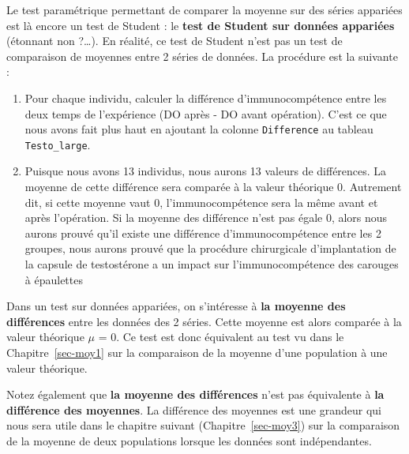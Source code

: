 \documentclass[
  french,
  a4paper,
  DIV=11,
  numbers=noendperiod,
  oneside]{scrreprt}
\providecommand{\tightlist}{%
  \setlength{\itemsep}{0pt}\setlength{\parskip}{0pt}}
\begin{document}
Le test paramétrique permettant de comparer la moyenne sur des séries
appariées est là encore un test de Student : le \textbf{test de Student
sur données appariées} (étonnant non ?\ldots). En réalité, ce test de
Student n'est pas un test de comparaison de moyennes entre 2 séries de
données. La procédure est la suivante :

\begin{enumerate}
\def\labelenumi{\arabic{enumi}.}
\tightlist
\item
  Pour chaque individu, calculer la différence d'immunocompétence entre
  les deux temps de l'expérience (DO après - DO avant opération). C'est
  ce que nous avons fait plus haut en ajoutant la colonne
  \texttt{Difference} au tableau \texttt{Testo\_large}.
\item
  Puisque nous avons 13 individus, nous aurons 13 valeurs de
  différences. La moyenne de cette différence sera comparée à la valeur
  théorique 0. Autrement dit, si cette moyenne vaut 0,
  l'immunocompétence sera la même avant et après l'opération. Si la
  moyenne des différence n'est pas égale 0, alors nous aurons prouvé
  qu'il existe une différence d'immunocompétence entre les 2 groupes,
  nous aurons prouvé que la procédure chirurgicale d'implantation de la
  capsule de testostérone a un impact sur l'immunocompétence des
  carouges à épaulettes
\end{enumerate}

\begin{tcolorbox}[enhanced jigsaw, arc=.35mm, bottomrule=.15mm, bottomtitle=1mm, breakable, colback=white, colbacktitle=quarto-callout-warning-color!10!white, colframe=quarto-callout-warning-color-frame, coltitle=black, left=2mm, leftrule=.75mm, opacityback=0, opacitybacktitle=0.6, rightrule=.15mm, title=\textcolor{quarto-callout-warning-color}{\faExclamationTriangle}\hspace{0.5em}{Attention}, titlerule=0mm, toprule=.15mm, toptitle=1mm]

Dans un test sur données appariées, on s'intéresse à \textbf{la moyenne
des différences} entre les données des 2 séries. Cette moyenne est alors
comparée à la valeur théorique \(\mu\) = 0. Ce test est donc équivalent
au test vu dans le Chapitre~\ref{sec-moy1} sur la comparaison de la
moyenne d'une population à une valeur théorique.

Notez également que \textbf{la moyenne des différences} n'est pas
équivalente à \textbf{la différence des moyennes}. La différence des
moyennes est une grandeur qui nous sera utile dans le chapitre suivant
(Chapitre~\ref{sec-moy3}) sur la comparaison de la moyenne de deux
populations lorsque les données sont indépendantes.

\end{tcolorbox}
\end{document}

